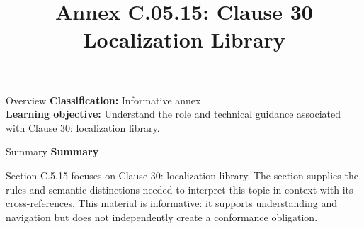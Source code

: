 \documentclass[10pt,letterpaper]{article}
\title{Annex C.05.15: Clause 30 Localization Library}
\author{}
\date{}
\begin{document}
\maketitle
\begin{CornellOverviewBox}{Overview}
\textbf{Classification:} Informative annex\\[2pt]
\textbf{Learning objective:} Understand the role and technical guidance associated with Clause 30: localization library.
\end{CornellOverviewBox}\begin{CornellSummaryBox}{Summary}
{\sffamily\bfseries\color{Accent} Summary}\par\vspace{3pt}Section C.5.15 focuses on Clause 30: localization library. The section supplies the rules and semantic distinctions needed to interpret this topic in context with its cross-references. This material is informative: it supports understanding and navigation but does not independently create a conformance obligation.
\end{CornellSummaryBox}
\end{document}
